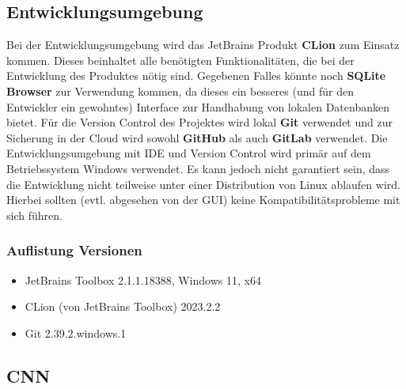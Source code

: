 \subsection{Entwicklungsumgebung}
\label{sec:AnalyseEntwicklungsumgebung}
Bei der Entwicklungsumgebung wird das JetBrains Produkt \textbf{CLion} zum Einsatz kommen. Dieses beinhaltet alle benötigten Funktionalitäten, die bei der Entwicklung des Produktes nötig sind. Gegebenen Falles könnte noch \textbf{SQLite Browser} zur Verwendung kommen, da dieses ein besseres (und für den Entwickler ein gewohntes) Interface zur Handhabung von lokalen Datenbanken bietet. Für die Version Control des Projektes wird lokal \textbf{Git} verwendet und zur Sicherung in der Cloud wird sowohl \textbf{GitHub} als auch \textbf{GitLab} verwendet. Die Entwicklungsumgebung mit IDE und Version Control wird primär auf dem Betriebssystem Windows verwendet. Es kann jedoch nicht garantiert sein, dass die Entwicklung nicht teilweise unter einer Distribution von Linux ablaufen wird. Hierbei sollten (evtl. abgesehen von der GUI) keine Kompatibilitätsprobleme mit sich führen. 
\subsubsection{Auflistung Versionen}
\label{sec:AnalyseDevEnvAuflistung}
\begin{itemize}
	\item JetBrains Toolbox 2.1.1.18388, Windows 11, x64
	\item CLion (von JetBrains Toolbox) 2023.2.2
	\item Git 2.39.2.windows.1
\end{itemize}

\subsection{CNN}
\label{sec:AnalyseCNN}

